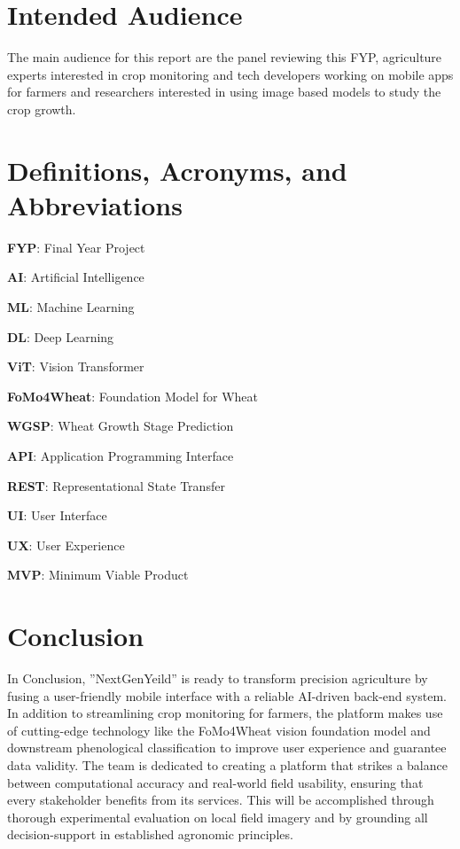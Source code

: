 \documentclass{FastFyp}
\begin{document}
 
\section{Intended Audience}
The main audience for this report are the panel reviewing this FYP, agriculture experts interested in crop monitoring and tech developers working on mobile apps for farmers and researchers interested in using image based models to study the crop growth. 

\section{Definitions, Acronyms, and Abbreviations}

\textbf{FYP}: Final Year Project  

\textbf{AI}: Artificial Intelligence  

\textbf{ML}: Machine Learning  

\textbf{DL}: Deep Learning  

\textbf{ViT}: Vision Transformer  

\textbf{FoMo4Wheat}: Foundation Model for Wheat  

\textbf{WGSP}: Wheat Growth Stage Prediction  

\textbf{API}: Application Programming Interface  

\textbf{REST}: Representational State Transfer  

\textbf{UI}: User Interface  

\textbf{UX}: User Experience  

\textbf{MVP}: Minimum Viable Product

 
\section{Conclusion}
In Conclusion, ”NextGenYeild” is ready to transform precision agriculture by fusing a user-friendly mobile interface with a reliable AI-driven back-end system. In addition to streamlining crop monitoring for farmers, the platform makes use of cutting-edge technology like the FoMo4Wheat vision foundation model and downstream phenological classification to improve user experience and guarantee data validity. The team is dedicated to creating a platform that strikes a balance between computational accuracy and real-world field usability, ensuring that every stakeholder benefits from its services. This will be accomplished through thorough experimental evaluation on local field imagery and by grounding all decision-support in established agronomic principles.
\end{document}
